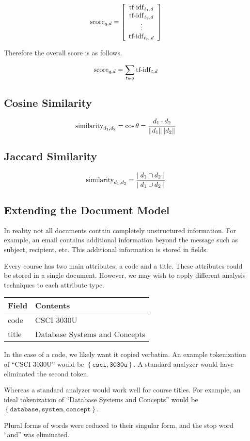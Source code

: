 			$$
				\mathrm{score}_{q, d} = 
				\left[
				\begin{array}{c}
					\operatorname{tf-idf}_{t_1, d} \\
					\operatorname{tf-idf}_{t_2, d} \\
					\vdots \\
					\operatorname{tf-idf}_{t_n, d}
				\end{array}
				\right]
			$$
			
			Therefore the overall score is as follows.
			
			$$\operatorname{score}_{q, d} = \sum_{t \in q} \operatorname{tf-idf}_{t, d}$$
		
	\subsection{Cosine Similarity}
		$$\operatorname{similarity}_{d_1, d_2} = \cos{\theta} = \frac{d_1 \cdot d_2}{\lVert d_1\rVert\lVert d_2\rVert}$$
	
	\subsection{Jaccard Similarity}
		$$\operatorname{similarity}_{d_1, d_2} = \frac{\mid d_1 \cap d_2\mid}{\mid d_1 \cup d_2\mid}$$
	
	\subsection{Extending the Document Model}
		In reality not all documents contain completely unstructured information.  For example, an email contains additional information beyond the message such as subject, recipient, etc.  This additional information is stored in fields.
		
		\begin{ex}
			Every course has two main attributes, a code and a title.  These attributes could be stored in a single document.  However, we may wish to apply different analysis techniques to each attribute type.
			
			\begin{table}
				\centering
				\begin{tabular}{ll}
					\toprule
					Field & Contents \\
					\midrule
					code & CSCI 3030U \\
					title & Database Systems and Concepts \\
					\bottomrule
				\end{tabular}
			\end{table}
			
			In the case of a code, we likely want it copied verbatim.  An example tokenization of ``CSCI 3030U'' would be $\left\{\texttt{csci}, \texttt{3030u}\right\}$.  A standard analyzer would have eliminated the second token.
			
			Whereas a standard analyzer would work well for course titles.  For example, an ideal tokenization of ``Database Systems and Concepts'' would be $\left\{\texttt{database}, \texttt{system}, \texttt{concept}\right\}$.
			
			Plural forms of words were reduced to their singular form, and the stop word ``and'' was eliminated.
		\end{ex}
	
